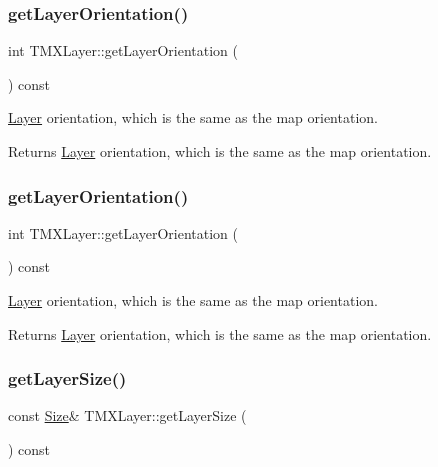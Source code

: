 \subsubsection{\texorpdfstring{get\+Layer\+Orientation()}{getLayerOrientation()}\hspace{0.1cm}{\footnotesize\ttfamily [1/2]}}
{\footnotesize\ttfamily int T\+M\+X\+Layer\+::get\+Layer\+Orientation (\begin{DoxyParamCaption}{ }\end{DoxyParamCaption}) const\hspace{0.3cm}{\ttfamily [inline]}}

\hyperlink{classLayer}{Layer} orientation, which is the same as the map orientation.

\begin{DoxyReturn}{Returns}
\hyperlink{classLayer}{Layer} orientation, which is the same as the map orientation. 
\end{DoxyReturn}
\mbox{\label{classTMXLayer_af461c95bbedda35e396ae3c7cc3d38f7}} 
\subsubsection{\texorpdfstring{get\+Layer\+Orientation()}{getLayerOrientation()}\hspace{0.1cm}{\footnotesize\ttfamily [2/2]}}
{\footnotesize\ttfamily int T\+M\+X\+Layer\+::get\+Layer\+Orientation (\begin{DoxyParamCaption}{ }\end{DoxyParamCaption}) const\hspace{0.3cm}{\ttfamily [inline]}}

\hyperlink{classLayer}{Layer} orientation, which is the same as the map orientation.

\begin{DoxyReturn}{Returns}
\hyperlink{classLayer}{Layer} orientation, which is the same as the map orientation. 
\end{DoxyReturn}
\mbox{\label{classTMXLayer_a33aa146a907ade5080f67817ee8f552d}} 
\subsubsection{\texorpdfstring{get\+Layer\+Size()}{getLayerSize()}\hspace{0.1cm}{\footnotesize\ttfamily [1/2]}}
{\footnotesize\ttfamily const \hyperlink{classSize}{Size}\& T\+M\+X\+Layer\+::get\+Layer\+Size (\begin{DoxyParamCaption}{ }\end{DoxyParamCaption}) const\hspace{0.3cm}{\ttfamily [inline]}}

